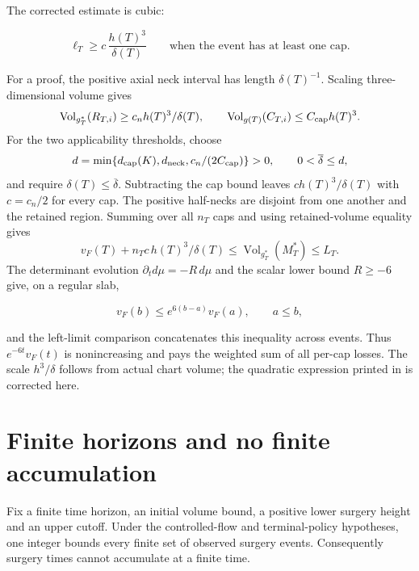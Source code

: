 The corrected estimate is cubic:

\begin{equation}
 \ell_T\geq c\,\frac{h(T)^3}{\delta(T)}
 \qquad\text{when the event has at least one cap}.
 \label{eq:global-cubic-loss}
\end{equation}

For a proof, the positive axial neck interval has length $\delta(T)^{-1}$.
Scaling three-dimensional volume gives
\[
 \operatorname{Vol}_{g_T^*}(R_{T,i})
 \geq c_n h(T)^3/\delta(T),\qquad
 \operatorname{Vol}_{g(T)}(C_{T,i})\leq C_{\rm cap}h(T)^3.
\]
For the two applicability thresholds, choose
\[
 d=\min\{d_{\rm cap}(K),d_{\rm neck},c_n/(2C_{\rm cap})\}>0,
 \qquad 0<\overline\delta\leq d,
\]
and require $\delta(T)\leq\overline\delta$. Subtracting the cap bound leaves
$c h(T)^3/\delta(T)$ with $c=c_n/2$ for every cap.
The positive half-necks are disjoint from one another and the retained
region. Summing over all $n_T$ caps and using retained-volume equality gives
\begin{equation}
 v_F(T)+n_T c\,h(T)^3/\delta(T)
 \leq\operatorname{Vol}_{g_T^*}(M_T^*)\leq L_T.
 \label{eq:global-all-cap-loss}
\end{equation}
The determinant evolution $\partial_t d\mu=-R\,d\mu$ and the scalar lower
bound $R\geq-6$ give, on a regular slab,

\begin{equation}
 v_F(b)\leq e^{6(b-a)}v_F(a),\qquad a\leq b,
 \label{eq:global-volume-growth}
\end{equation}

and the left-limit comparison concatenates this inequality across events.
Thus $e^{-6t}v_F(t)$ is nonincreasing and pays the weighted sum of all
per-cap losses.  The scale $h^3/\delta$ follows from actual chart volume;
the quadratic expression printed in \cite[Lemma 17.12, pp.~410--411]{MT2007}
is corrected here.

\section{Finite horizons and no finite accumulation}
\label{sec:global-finiteness}

\begin{theorem}
\label{thm:global-finiteness}
Fix a finite time horizon, an initial volume bound, a positive lower surgery
height and an upper cutoff. Under the controlled-flow and terminal-policy
hypotheses, one integer bounds every finite set of observed surgery events.
Consequently surgery times cannot accumulate at a finite time.
\end{theorem}


